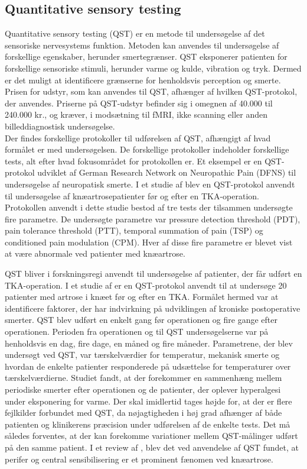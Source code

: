 \subsection{Quantitative sensory testing}
Quantitative sensory testing (QST) er en metode til undersøgelse af det sensoriske nervesystems funktion. Metoden kan anvendes til undersøgelse af forskellige egenskaber, herunder smertegrænser. QST eksponerer patienten for forskellige sensoriske stimuli, herunder varme og kulde, vibration og tryk. Dermed er det muligt at identificere grænserne for henholdsvis perception og smerte. \citep{Yarnitsky2006} Prisen for udstyr, som kan anvendes til QST, afhænger af hvilken QST-protokol, der anvendes. Priserne på QST-udstyr befinder sig i omegnen af 40.000 til 240.000 kr., og kræver, i modsætning til fMRI, ikke scanning eller anden billeddiagnostisk undersøgelse. \\
Der findes forskellige protokoller til udførelsen af QST, afhængigt af hvad formålet er med undersøgelsen. De forskellige protokoller indeholder forskellige tests, alt efter hvad fokusområdet for protokollen er. Et eksempel er en QST-protokol udviklet af German Research Network on Neuropathic Pain (DFNS) til undersøgelse af neuropatisk smerte. \citep{Rolke2006} I et studie af  blev en QST-protokol anvendt til undersøgelse af knæartrosepatienter før og efter en TKA-operation. Protokollen anvendt i dette studie bestod af tre tests der tilsammen undersøgte fire parametre. De undersøgte parametre var pressure detection threshold (PDT), pain tolerance threshold (PTT), temporal summation of pain (TSP) og conditioned pain modulation (CPM). \citep{Petersen2016} Hver af disse fire parametre er blevet vist at være abnormale ved patienter med knæartrose. \citep{Suokas2012} \citep{Petersen2016}

QST bliver i forskningsregi anvendt til undersøgelse af patienter, der får udført en TKA-operation. I et studie af  er en QST-protokol anvendt til at undersøge 20 patienter med artrose i knæet før og efter en TKA. Formålet hermed var at identificere faktorer, der har indvirkning på udviklingen af kroniske postoperative smerter. QST blev udført en enkelt gang før operationen og fire gange efter operationen. Perioden fra operationen og til QST undersøgelserne var på henholdsvis en dag, fire dage, en måned og fire måneder. Parametrene, der blev undersøgt ved QST, var tærskelværdier for temperatur, mekanisk smerte og hvordan de enkelte patienter responderede på udsættelse for temperaturer over tærskelværdierne. Studiet fandt, at der forekommer en sammenhæng mellem periodiske smerter efter operationen og de patienter, der oplever hyperalgesi under eksponering for varme. \citep{Martinez2007} Der skal imidlertid tages højde for, at der er flere fejlkilder forbundet med QST, da nøjagtigheden i høj grad afhænger af både patienten og klinikerens præcision under udførelsen af de enkelte tests. Det må således forventes, at der kan forekomme variationer mellem QST-målinger udført på den samme patient. \citep{Yarnitsky2006} I et review af , blev det ved anvendelse af QST fundet, at perifer og central sensibilisering er et prominent fænomen ved knæartrose.

